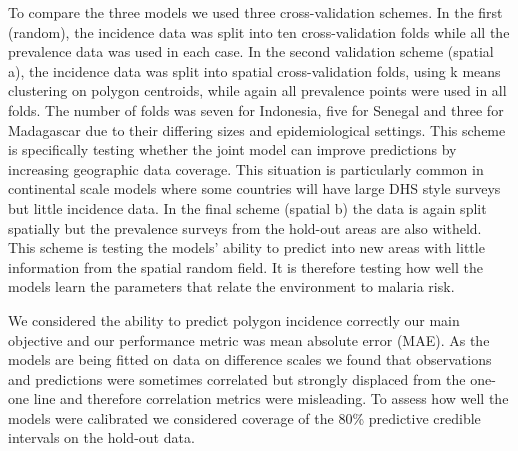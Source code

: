 \documentclass[10pt,letterpaper]{article}
\begin{document}
To compare the three models we used three cross-validation schemes. 
In the first (random), the incidence data was split into ten cross-validation folds while all the prevalence data was used in each case.
In the second validation scheme (spatial a), the incidence data was split into spatial cross-validation folds, using k means clustering on polygon centroids, while again all prevalence points were used in all folds.
The number of folds was seven for Indonesia, five for Senegal and three for Madagascar due to their differing sizes and epidemiological settings.
This scheme is specifically testing whether the joint model can improve predictions by increasing geographic data coverage.
This situation is particularly common in continental scale models where some countries will have large DHS style surveys but little incidence data.
In the final scheme (spatial b) the data is again split spatially but the prevalence surveys from the hold-out areas are also witheld.
This scheme is testing the models' ability to predict into new areas with little information from the spatial random field.
It is therefore testing how well the models learn the parameters that relate the environment to malaria risk.

We considered the ability to predict polygon incidence correctly our main objective and our performance metric was mean absolute error (MAE).
As the models are being fitted on data on difference scales we found that observations and predictions were sometimes correlated but strongly displaced from the one-one line and therefore correlation metrics were misleading.
To assess how well the models were calibrated we considered coverage of the 80\% predictive credible intervals on the hold-out data.
\end{document}
